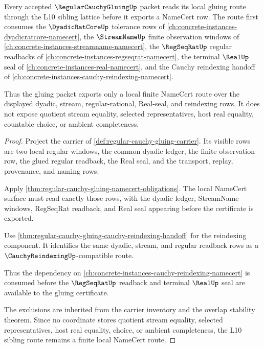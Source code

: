 \begin{theorem}
\label{thm:regular-cauchy-gluing-l10-sibling-route}
Every accepted $\RegularCauchyGluingUp$ packet reads its local gluing route
through the L10 sibling lattice before it exports a NameCert row. The route
first consumes the $\DyadicRatCoreUp$ tolerance rows of
\autoref{ch:concrete-instances-dyadicratcore-namecert}, the $\StreamNameUp$
finite observation windows of
\autoref{ch:concrete-instances-streamname-namecert}, the $\RegSeqRatUp$
regular readbacks of \autoref{ch:concrete-instances-regseqrat-namecert}, the
terminal $\RealUp$ seal of \autoref{ch:concrete-instances-real-namecert}, and
the Cauchy reindexing handoff of
\autoref{ch:concrete-instances-cauchy-reindexing-namecert}.

Thus the gluing packet exports only a local finite NameCert route over the
displayed dyadic, stream, regular-rational, Real-seal, and reindexing rows. It
does not expose quotient stream equality, selected representatives, host real
equality, countable choice, or ambient completeness.
\end{theorem}
\begin{proof}
Project the carrier of \autoref{def:regular-cauchy-gluing-carrier}. Its
visible rows are two local regular windows, the common dyadic ledger, the
finite observation row, the glued regular readback, the Real seal, and the
transport, replay, provenance, and naming rows.

Apply \autoref{thm:regular-cauchy-gluing-namecert-obligations}. The local
NameCert surface must read exactly those rows, with the dyadic ledger,
StreamName windows, RegSeqRat readback, and Real seal appearing before the
certificate is exported.

Use \autoref{thm:regular-cauchy-gluing-cauchy-reindexing-handoff} for the
reindexing component. It identifies the same dyadic, stream, and regular
readback rows as a $\CauchyReindexingUp$-compatible route.

Thus the dependency on \autoref{ch:concrete-instances-cauchy-reindexing-namecert}
is consumed before the $\RegSeqRatUp$ readback and terminal $\RealUp$ seal are
available to the gluing certificate.

The exclusions are inherited from the carrier inventory and the overlap
stability theorem. Since no coordinate stores quotient stream equality,
selected representatives, host real equality, choice, or ambient completeness,
the L10 sibling route remains a finite local NameCert route.
\end{proof}

